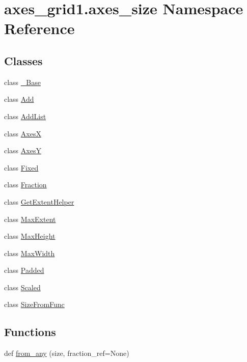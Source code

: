 \hypertarget{namespaceaxes__grid1_1_1axes__size}{}\section{axes\+\_\+grid1.\+axes\+\_\+size Namespace Reference}
\label{namespaceaxes__grid1_1_1axes__size}
\subsection*{Classes}
\begin{DoxyCompactItemize}
\item 
class \hyperlink{classaxes__grid1_1_1axes__size_1_1__Base}{\+\_\+\+Base}
\item 
class \hyperlink{classaxes__grid1_1_1axes__size_1_1Add}{Add}
\item 
class \hyperlink{classaxes__grid1_1_1axes__size_1_1AddList}{Add\+List}
\item 
class \hyperlink{classaxes__grid1_1_1axes__size_1_1AxesX}{AxesX}
\item 
class \hyperlink{classaxes__grid1_1_1axes__size_1_1AxesY}{AxesY}
\item 
class \hyperlink{classaxes__grid1_1_1axes__size_1_1Fixed}{Fixed}
\item 
class \hyperlink{classaxes__grid1_1_1axes__size_1_1Fraction}{Fraction}
\item 
class \hyperlink{classaxes__grid1_1_1axes__size_1_1GetExtentHelper}{Get\+Extent\+Helper}
\item 
class \hyperlink{classaxes__grid1_1_1axes__size_1_1MaxExtent}{Max\+Extent}
\item 
class \hyperlink{classaxes__grid1_1_1axes__size_1_1MaxHeight}{Max\+Height}
\item 
class \hyperlink{classaxes__grid1_1_1axes__size_1_1MaxWidth}{Max\+Width}
\item 
class \hyperlink{classaxes__grid1_1_1axes__size_1_1Padded}{Padded}
\item 
class \hyperlink{classaxes__grid1_1_1axes__size_1_1Scaled}{Scaled}
\item 
class \hyperlink{classaxes__grid1_1_1axes__size_1_1SizeFromFunc}{Size\+From\+Func}
\end{DoxyCompactItemize}
\subsection*{Functions}
\begin{DoxyCompactItemize}
\item 
def \hyperlink{namespaceaxes__grid1_1_1axes__size_a30da3c4637b026d06d84e968b787fe89}{from\+\_\+any} (size, fraction\+\_\+ref=None)
\end{DoxyCompactItemize}
